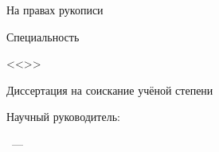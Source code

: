 \thispagestyle{empty}

\begin{center}
\thesisOrganization \par
\par
\end{center}

\vspace{10mm}
\begin{flushright}
На правах рукописи

\end{flushright}

\vspace{10mm}
\begin{center}
{\large \thesisAuthor}
\end{center}

\vspace{5mm}
\begin{center}
{\bf \large \thesisTitle
\par}

\vspace{10mm}
{%
Специальность \thesisSpecialtyNumber

<<\thesisSpecialtyTitle>>
}

\vspace{10mm}
Диссертация на соискание учёной степени

\thesisDegree
\end{center}

\vspace{10mm}
\begin{flushright}
Научный руководитель:

\supervisorRegalia

\supervisorFio

\end{flushright}

\vspace{20mm}
\begin{center}
{\thesisCity~--- \thesisYear}
\end{center}

\newpage
